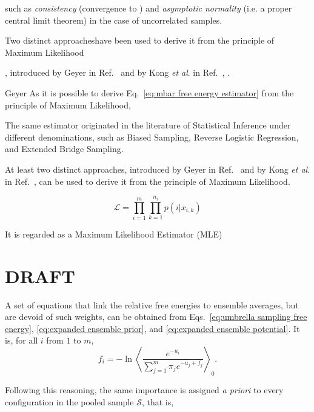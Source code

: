 \documentclass[aip,jcp,preprint,amsmath,amssymb]{revtex4-1}
\begin{document}
such as \textit{consistency} (convergence to ) and \textit{asymptotic normality} (i.e. a proper central limit theorem) in the case of uncorrelated samples.


Two distinct approacheshave been used to derive it from the principle of Maximum Likelihood


, introduced by Geyer in Ref.~ and by Kong \textit{et al}. in Ref.~, .



Geyer\cite{Geyer_1994} As it is possible to derive Eq.~\eqref{eq:mbar free energy estimator} from the principle of Maximum Likelihood,


The same estimator originated in the literature of Statistical Inference under different denominations, such as Biased Sampling,\cite{Vardi_1985, *Gill_1988} Reverse Logistic Regression,\cite{Geyer_1994} and Extended Bridge Sampling.\cite{Meng_1996, Kong_2003, Tan_2004} 



At least two distinct approaches, introduced by Geyer in Ref.~ and by Kong \textit{et al}. in Ref.~, can be used to derive it from the principle of Maximum Likelihood.

\begin{equation}
\mathcal L = \prod_{i=1}^m \prod_{k=1}^{n_i} p(i|x_{i,k})
\end{equation}


It is regarded as a Maximum Likelihood Estimator (MLE)

\section{DRAFT}

A set of equations that link the relative free energies to ensemble averages, but are devoid of such weights, can be obtained from Eqs.~\eqref{eq:umbrella sampling free energy}, \eqref{eq:expanded ensemble prior}, and \eqref{eq:expanded ensemble potential}. It is, for all $i$ from $1$ to $m$,
\begin{equation}
\label{eq:mbar free energy exact}
f_i = -\ln \left\langle \frac{e^{-u_i}}{\sum_{j=1}^m \pi_j e^{-u_j + f_j}} \right\rangle_0.
\end{equation}

Following this reasoning, the same importance is assigned \textit{a priori} to every configuration in the pooled sample $\mathcal S$, that is, 
\end{document}
